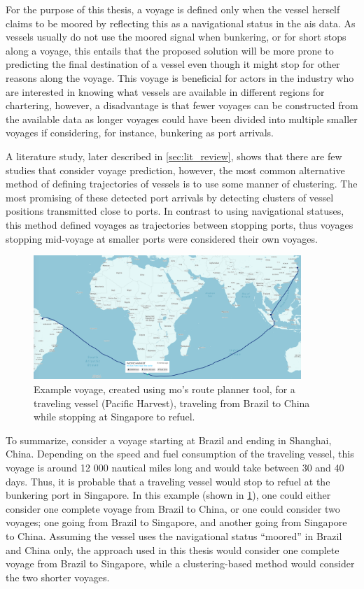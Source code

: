 For the purpose of this thesis, a voyage is defined only when the vessel herself claims to be moored by reflecting this as a navigational status in the \acrfull{ais} data. As vessels usually do not use the moored signal when bunkering, or for short stops along a voyage, this entails that the proposed solution will be more prone to predicting the final destination of a vessel even though it might stop for other reasons along the voyage. This voyage is beneficial for actors in the industry who are interested in knowing what vessels are available in different regions for chartering, however, a disadvantage is that fewer voyages can be constructed from the available data as longer voyages could have been divided into multiple smaller voyages if considering, for instance, bunkering as port arrivals.

A literature study, later described in \cref{sec:lit_review}, shows that there are few studies that consider voyage prediction, however, the most common alternative method of defining trajectories of vessels is to use some manner of clustering. The most promising of these detected port arrivals by detecting clusters of vessel positions transmitted close to ports. In contrast to using navigational statuses, this method defined voyages as trajectories between stopping ports, thus voyages stopping mid-voyage at smaller ports were considered their own voyages.

\begin{figure}[htbp]  %
    \centering
    \includegraphics[width=0.9\textwidth]{figures/mo_voyage}
    \caption{Example voyage, created using \acrshort{mo}'s route planner tool, for a traveling vessel (Pacific Harvest), traveling from Brazil to China while stopping at Singapore to refuel.}
    \label{fig:example_voyage}
\end{figure}

To summarize, consider a voyage starting at Brazil and ending in Shanghai, China. Depending on the speed and fuel consumption of the traveling vessel, this voyage is around 12 000 nautical miles long and would take between 30 and 40 days. Thus, it is probable that a traveling vessel would stop to refuel at the bunkering port in Singapore. In this example (shown in \cref{fig:example_voyage}), one could either consider one complete voyage from Brazil to China, or one could consider two voyages; one going from Brazil to Singapore, and another going from Singapore to China. Assuming the vessel uses the navigational status ``moored'' in Brazil and China only, the approach used in this thesis would consider one complete voyage from Brazil to Singapore, while a clustering-based method would consider the two shorter voyages.

